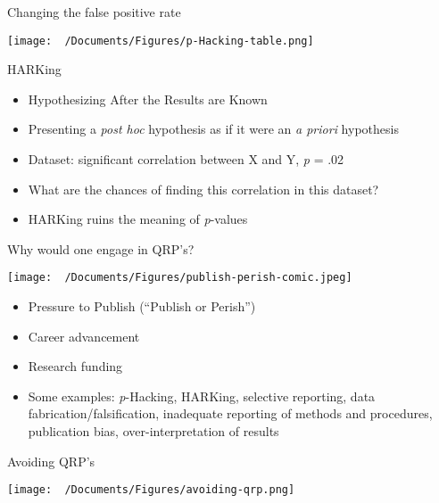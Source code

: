 \documentclass[
  ignorenonframetext,
  aspectratio=169,
]{beamer}
\providecommand{\tightlist}{%
  \setlength{\itemsep}{0pt}\setlength{\parskip}{0pt}}\usepackage{longtable,booktabs,array}
\begin{document}
\begin{frame}{Changing the false positive rate}
\label{changing-the-false-positive-rate}
\begin{center}
\texttt{[image: ~/Documents/Figures/p-Hacking-table.png]}
\end{center}
\end{frame}

\begin{frame}{HARKing}
\label{harking}
\begin{itemize}[<+->]
\tightlist
\item
  Hypothesizing After the Results are Known
\item
  Presenting a \emph{post hoc} hypothesis as if it were an \emph{a
  priori} hypothesis
\item
  Dataset: significant correlation between X and Y, \emph{p} = .02
\item
  What are the chances of finding this correlation in this dataset?
\item
  HARKing ruins the meaning of \emph{p}-values
\end{itemize}
\end{frame}

\begin{frame}{Why would one engage in QRP's?}
\label{why-would-one-engage-in-qrps}
\begin{center}
\texttt{[image: ~/Documents/Figures/publish-perish-comic.jpeg]}
\end{center}
\end{frame}

\begin{frame}{}
\label{section}
\begin{itemize}[<+->]
\tightlist
\item
  Pressure to Publish (``Publish or Perish'')
\item
  Career advancement
\item
  Research funding
\item
  Some examples: \emph{p}-Hacking, HARKing, selective reporting, data
  fabrication/falsification, inadequate reporting of methods and
  procedures, publication bias, over-interpretation of results
\end{itemize}
\end{frame}

\begin{frame}{Avoiding QRP's}
\label{avoiding-qrps}
\begin{center}
\texttt{[image: ~/Documents/Figures/avoiding-qrp.png]}
\end{center}
\end{frame}
\end{document}

